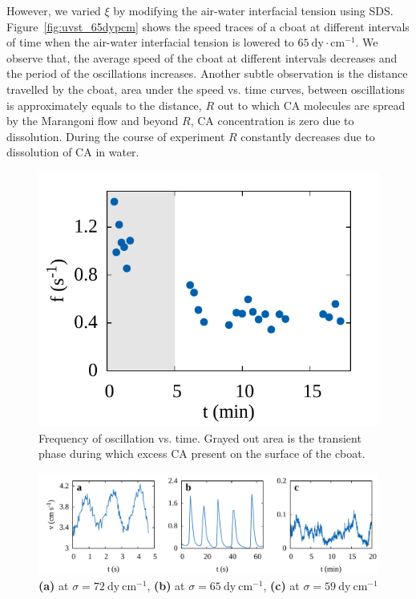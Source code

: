\documentclass[journal=langd5, manuscript=article, layout=twocolumn]{achemso}
\begin{document}
However, we varied $\xi$ by modifying the air-water interfacial tension using SDS. Figure~\ref{fig:uvst_65dypcm} shows the speed traces of a cboat at different intervals of time when the air-water interfacial tension is lowered to $65\ \mathrm{dy\cdot cm^{-1}}$. We observe that, the average speed of the cboat at different intervals decreases and the period of the oscillations increases. Another subtle observation is the distance travelled by the cboat, area under the speed vs. time curves, between oscillations is approximately equals to the distance, $R$ out to which CA molecules are spread by the Marangoni flow and beyond $R$, CA concentration is zero due to dissolution. During the course of experiment $R$ constantly decreases due to dissolution of CA in water. 
\begin{figure}[ht] 
    \centering
       \includegraphics[width=\linewidth]{freqvst.pdf}
    \caption{Frequency of oscillation vs. time. Grayed out area is the transient phase during which excess CA present on the surface of the cboat.}
    \label{fig:freqvst}
\end{figure}
\begin{figure}[ht]
	\centering
	\includegraphics[width=\textwidth]{uvst_sigma.pdf}
	\caption{{\bf (a)} at $\sigma = 72\ \mathrm{dy\ cm^{-1}}$, {\bf (b)} at $\sigma = 65\ \mathrm{dy\ cm^{-1}}$, {\bf (c)} at $\sigma = 59\ \mathrm{dy\ cm^{-1}}$}
\label{fig:uvst_sigma}
\end{figure}
\end{document}
